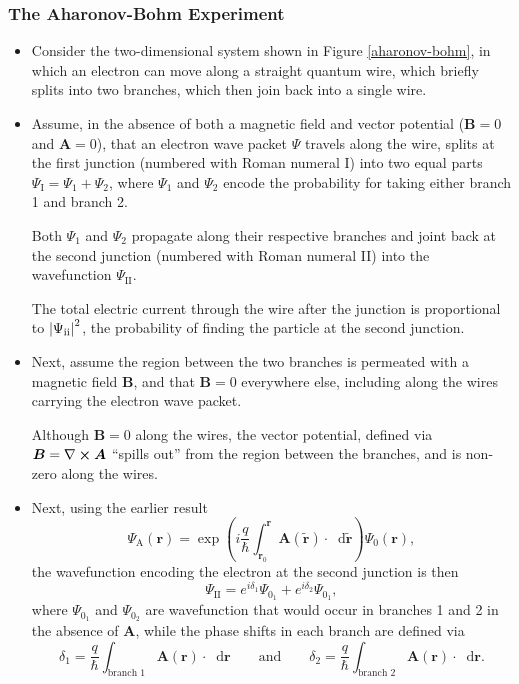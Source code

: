 \documentclass[11pt, a4paper]{article}
\newcommand{\diff}{\mathop{}\!\mathrm{d}} %
\renewcommand{\curl}{\nabla \cross}
\newcommand{\eqtext}[1]{\qquad \text{#1} \qquad}
\renewcommand{\vec}[1]{\bm{#1}}  %
\renewcommand{\t}[1]{\tilde{#1}}
\renewcommand{\r}{\vec{r}}  %
\newcommand{\A}{\vec{A}}  %
\newcommand{\B}{\vec{B}}  %
\renewcommand{\P}{\Psi}  %
\begin{document}
\subsubsection{The Aharonov-Bohm Experiment}
\begin{itemize}
    \item Consider the two-dimensional system shown in Figure \ref{aharonov-bohm}, in which an electron can move along a straight quantum wire, which briefly splits into two branches, which then join back into a single wire.
	
	\item Assume, in the absence of both a magnetic field and vector potential ($ \B = 0 $ and $ \A = 0 $), that an electron wave packet $ \P $ travels along the wire, splits at the first junction (numbered with Roman numeral I) into two equal parts $ \P_{\text{I}} = \P_{1} + \P_{2} $, where $ \P_{1} $ and $ \P_{2} $ encode the probability for taking either branch 1 and branch 2.
	
	Both $ \P_{1} $ and $ \P_{2} $ propagate along their respective branches and joint back at the second junction (numbered with Roman numeral II) into the wavefunction $ \P_{\text{II}} $.
	
	The total electric current through the wire after the junction is proportional to $ \abs{\P_{\text{ii}}}^{2} $, the probability of finding the particle at the second junction.
	
	\item Next, assume the region between the two branches is permeated with a magnetic field $ \B $, and that $ \B = 0 $ everywhere else, including along the wires carrying the electron wave packet. 
	
	Although $ \B = 0 $ along the wires, the vector potential, defined via $ \B = \curl \A $ ``spills out'' from the region between the branches, and is non-zero along the wires. 
	
    \item Next, using the earlier result
    \begin{equation*}
		\P_{\text{A}}(\r) = \exp\left(i\frac{q}{\hbar} \int_{\r_{0}}^{\r}\A(\t{\r})\cdot \diff\t{\r}\right) \P_{0}(\r),
    \end{equation*}
	the wavefunction encoding the electron at the second junction is then
	\begin{equation*}
		\P_{\text{II}} = e^{i\delta_{1}} \P_{0_{1}} + e^{i\delta_{2}}\P_{0_{1}},
	\end{equation*}
	where $ \P_{0_{1}} $ and $ \P_{0_{2}} $ are wavefunction that would occur in branches 1 and 2 in the absence of $ \A $, while the phase shifts in each branch are defined via
	\begin{equation*}
		\delta_{1} = \frac{q}{\hbar} \int_{\text{branch 1}} \A(\r) \cdot \diff \r \eqtext{and} \delta_{2} = \frac{q}{\hbar} \int_{\text{branch 2}} \A(\r) \cdot \diff \r.
	\end{equation*}
	

\end{itemize}
\end{document}
